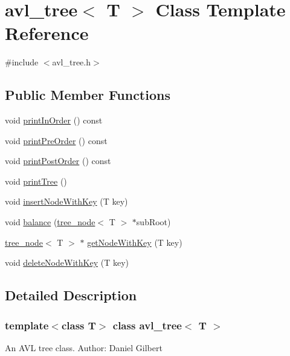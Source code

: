 \hypertarget{classavl__tree}{}\section{avl\+\_\+tree$<$ T $>$ Class Template Reference}
\label{classavl__tree}


{\ttfamily \#include $<$avl\+\_\+tree.\+h$>$}

\subsection*{Public Member Functions}
\begin{DoxyCompactItemize}
\item 
void \hyperlink{classavl__tree_a524ae6ac5d7f7c2399fb758aba84af80}{print\+In\+Order} () const
\item 
void \hyperlink{classavl__tree_ac17fa1e4aa2f0f4b609a7b72c34bd2f6}{print\+Pre\+Order} () const
\item 
void \hyperlink{classavl__tree_a5fb83061648947aeb6b540a5dee7ae13}{print\+Post\+Order} () const
\item 
void \hyperlink{classavl__tree_ae067ad48ed35e1df18fdda1ed83c3d79}{print\+Tree} ()
\item 
void \hyperlink{classavl__tree_afece250225096dba051bd467e89b3657}{insert\+Node\+With\+Key} (T key)
\item 
void \hyperlink{classavl__tree_a97854f2ab9e9e89b0dfc2e262a4bca0f}{balance} (\hyperlink{classtree__node}{tree\+\_\+node}$<$ T $>$ $\ast$sub\+Root)
\item 
\hyperlink{classtree__node}{tree\+\_\+node}$<$ T $>$ $\ast$ \hyperlink{classavl__tree_acc15be343ae8c57859902e5e2b55c2a2}{get\+Node\+With\+Key} (T key)
\item 
void \hyperlink{classavl__tree_a2ed74e7f2e93edea90c5867ec127086f}{delete\+Node\+With\+Key} (T key)
\end{DoxyCompactItemize}


\subsection{Detailed Description}
\subsubsection*{template$<$class T$>$\newline
class avl\+\_\+tree$<$ T $>$}

An A\+VL tree class. Author\+: Daniel Gilbert 

